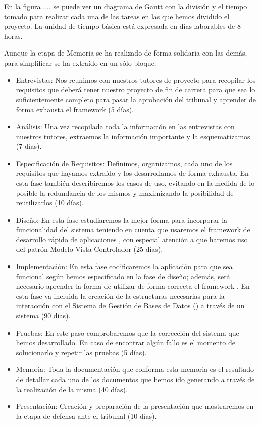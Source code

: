 En la figura .... se puede ver un diagrama de Gantt con la división y el tiempo
tomado para realizar cada una de las tareas en las que hemos dividido el
proyecto. La unidad de tiempo básica está expresada en días laborables de 8
horas.

Aunque la etapa de Memoria se ha realizado de forma solidaria con las demás,
para simplificar se ha extraído en un sólo bloque.

\begin{itemize}
\item Entrevistas: Nos reunimos con nuestros tutores de proyecto para recopilar
  los requisitos que deberá tener nuestro proyecto de fin de carrera para que
  sea lo suficientemente completo para pasar la aprobación del tribunal y
  aprender de forma exhausta el framework  (5 días).
\item Análisis: Una vez recopilada toda la información en las entrevistas con
  nuestros tutores, extraemos la información importante y la esquematizamos (7
  días).
\item Especificación de Requisitos: Definimos, organizamos, cada uno de los
  requisitos que hayamos extraído y los desarrollamos de forma exhausta. En esta
  fase también describiremos los casos de uso, evitando en la medida de lo
  posible la redundancia de los mismos y maximizando la posibilidad de
  reutilizarlos (10 días).
\item Diseño: En esta fase estudiaremos la mejor forma para incorporar la
  funcionalidad del sistema teniendo en cuenta que usaremos el framework de
  desarrollo rápido de aplicaciones , con especial
  atención a que haremos uso del patrón Modelo-Vista-Controlador (25 días).
\item Implementación: En esta fase codificaremos la aplicación para que sea
  funcional según hemos especificado en la fase de diseño; además, será
  necesario aprender la forma de utilizar de forma correcta el framework
  . En esta fase va incluida la creación de la
  estructuras necesarias para la interacción con el Sistema de Gestión de Bases
  de Datos () a través de un sistema  (90 días).
\item Pruebas: En este paso comprobaremos que la corrección del sistema que
  hemos desarrollado. En caso de encontrar algún fallo es el momento de
  solucionarlo y repetir las pruebas (5 días).
\item Memoria: Toda la documentación que conforma esta memoria es el resultado
  de detallar cada uno de los documentos que hemos ido generando a través de la
  realización de la misma (40 días).
\item Presentación: Creación y preparación de la presentación que mostraremos en
  la etapa de defensa ante el tribunal (10 días).
\end{itemize}

